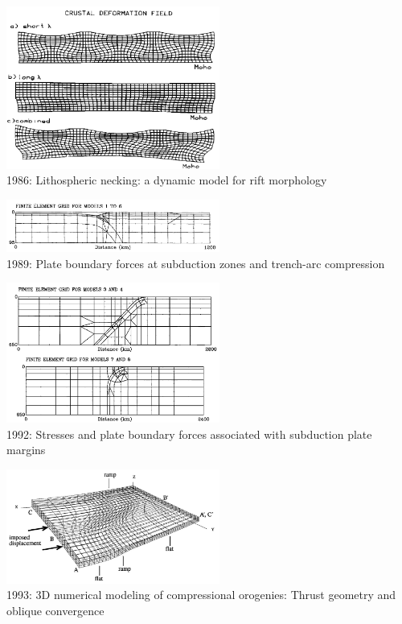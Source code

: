 \begin{center}
\includegraphics[width=7cm]{images/history/zupf86}\\
{\small 1986: Lithospheric necking: a dynamic model for rift morphology \cite{zupf86}}
\end{center}

\begin{center}
\includegraphics[width=7cm]{images/history/boww89}\\
{\small 1989: Plate boundary forces at subduction zones and trench-arc compression \cite{boww89}}
\end{center}

\begin{center}
\includegraphics[width=7cm]{images/history/whbw92}\\
{\small 1992: Stresses and plate boundary forces associated with subduction plate margins
\cite{whbw92}}
\end{center}

\begin{center}
\includegraphics[width=7cm]{images/history/brau93}\\
{\small 1993: 3D numerical modeling of
compressional orogenies: Thrust geometry and
oblique convergence \cite{brau93}}
\end{center}

